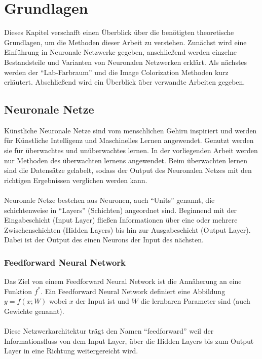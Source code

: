 \chapter{Grundlagen}
Dieses Kapitel verschafft einen Überblick über die benötigten theoretische Grundlagen, um die Methoden dieser Arbeit zu verstehen. 
Zunächst wird eine Einführung in Neuronale Netzwerke gegeben, anschließend werden
einzelne Bestandsteile und Varianten von Neuronalen Netzwerken erklärt. 
Als nächstes werden der ``Lab-Farbraum'' und die Image Colorization Methoden kurz erläutert. Abschließend wird ein Überblick über verwandte Arbeiten gegeben.

\section{Neuronale Netze}
Künstliche Neuronale Netze sind vom menschlichen Gehirn inspiriert und werden für Künstliche Intelligenz und Maschinelles Lernen
angewendet. Genutzt werden sie für überwachtes und unüberwachtes lernen. In der vorliegenden Arbeit werden nur Methoden des überwachten
lernens angewendet. Beim überwachten lernen sind die Datensätze gelabelt, sodass der Output des Neuronalen Netzes mit den richtigen Ergebnissen
verglichen werden kann.
\\
\\
Neuronale Netze bestehen aus Neuronen, auch ``Units'' genannt, die schichtenweise in ``Layers'' (Schichten) angeordnet sind.
Beginnend mit der Eingabeschicht (Input \gls{Layer}) fließen Informationen über eine oder mehrere Zwischenschichten (Hidden \gls{Layer}s) bis hin zur 
Ausgabeschicht (Output \gls{Layer}). Dabei ist der Output des einen Neurons der Input des nächsten. \cite{neuronale-netze-aufbau}

\subsection{Feedforward Neural Network}
Das Ziel von einem Feedforward Neural Network ist die Annäherung an eine Funktion $ f^* $. Ein Feedforward Neural Network definiert 
eine Abbildung $ y = f(x;W) $ wobei $ x $ der Input ist und $ W $ die lernbaren Parameter sind (auch Gewichte genannt).
\cite[164-223]{Goodfellow-et-al-2016}
\\
\\
Diese Netzwerkarchitektur trägt den Namen ``feedforward'' weil der Informationsfluss von dem Input \gls{Layer},
über die Hidden Layers bis zum Output \gls{Layer} in eine Richtung weitergereicht wird.

